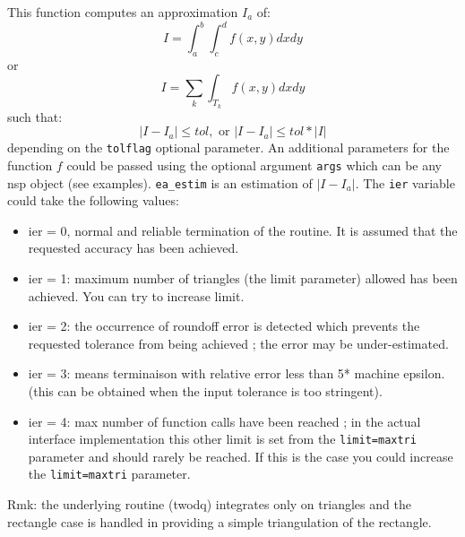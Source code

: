 \begin{mandescription}
This function computes an approximation $I_a$ of:
$$
   I = \int_a^b \int_c^d f(x,y) dxdy
$$
or
$$
   I = \sum_k \int_{T_k} f(x,y) dxdy
$$
such that:
$$
   | I - I_a | \le  tol, \mbox{ or } | I - I_a | \le  tol*|I|
$$
depending on the \verb+tolflag+ optional parameter.
An additional parameters for the function $f$ could be passed using the
optional argument \verb+args+ which can be any nsp object (see
examples). \verb+ea_estim+ is an estimation of $| I - I_a |$. The
\verb+ier+ variable could take the following values: 
\begin{itemize}
\item ier = 0,  normal and reliable termination of the routine. It is assumed that the
      requested  accuracy has been achieved.
\item ier = 1: maximum number of triangles (the limit
      parameter) allowed has been achieved. You can try to
      increase limit.
\item ier = 2: the occurrence of roundoff error is detected
      which prevents the requested tolerance from being
      achieved ; the error may be under-estimated.
\item ier = 3: means terminaison with relative error less than 5* machine epsilon.
      (this can be obtained when the input tolerance is too stringent).
\item ier = 4: max number of function calls have been reached ;
      in the actual interface implementation this other limit is set
      from the \verb+limit=maxtri+ parameter and should rarely be
      reached. If this is the case you could increase the
      \verb+limit=maxtri+ parameter.
\end{itemize}

Rmk: the underlying routine (twodq) integrates only on triangles and
the rectangle case is handled in providing a simple triangulation of
the rectangle. 
\end{mandescription}

